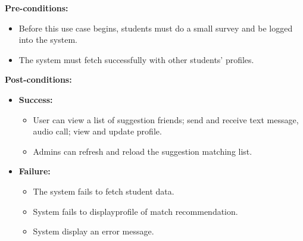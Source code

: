 \documentclass{article}
\begin{document}
    \noindent \textbf{Pre-conditions:} 
        \begin{itemize}
            \item Before this use case begins, students must do a small survey and be logged into the system.
            \item The system must fetch successfully with other students’ profiles.
        \end{itemize}
    \noindent \textbf{Post-conditions:}
    \begin{itemize}
        \item \textbf{Success:}
        \begin{itemize}
            \item User can view a list of suggestion friends; send and receive text message, audio call; view and update profile.
            \item Admins can refresh and reload the suggestion matching list.
        \end{itemize}
        \item \textbf{Failure:}
        \begin{itemize}
            \item The system fails to fetch student data.
            \item System fails to displayprofile of match recommendation.
            \item System display an error message. 
        \end{itemize}
    \end{itemize}
\end{document}

